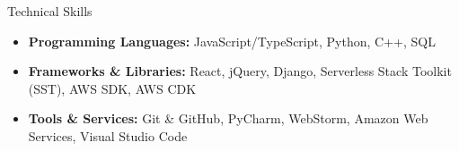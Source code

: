 \documentclass[]{mcdowellcv}
\begin{document}
	\begin{cvsection}{Technical Skills}
		\begin{cvsubsection}{}{}{}
			\begin{itemize}
				\item \textbf{Programming Languages:} JavaScript/TypeScript, Python, C++, SQL
				\item \textbf{Frameworks \& Libraries:} React, jQuery, Django, Serverless Stack Toolkit (SST), AWS SDK, AWS CDK
				\item \textbf{Tools \& Services:} Git \& GitHub, PyCharm, WebStorm, Amazon Web Services, Visual Studio Code
			\end{itemize}
		\end{cvsubsection}
	\end{cvsection}
	
\end{document}

